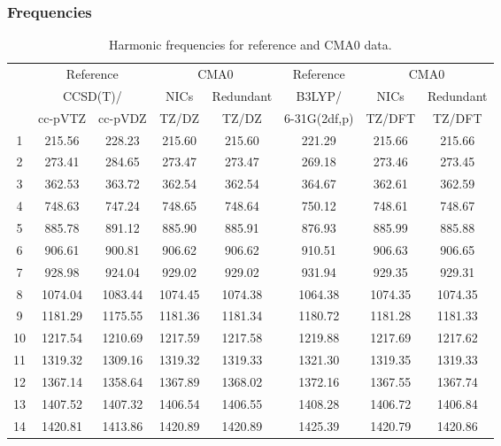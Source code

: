 \documentclass[10pt,oneside]{article}
\begin{document}
\begin{table}[h!]
\subsubsection*{Frequencies}
\centering
\caption{Harmonic frequencies for reference and CMA0 data.}
\begin{tabular}{cccccccc}
\toprule
{} & \multicolumn{2}{c}{Reference} & \multicolumn{2}{c}{CMA0} &    Reference & \multicolumn{2}{c}{CMA0} \\
{} & \multicolumn{2}{c}{CCSD(T)/} &    NICs &  Redundant &       B3LYP/ &    NICs & Redundant \\
{} &   cc-pVTZ & cc-pVDZ &   TZ/DZ &      TZ/DZ & 6-31G(2df,p) &  TZ/DFT &    TZ/DFT \\
\midrule
1  &    215.56 &  228.23 &  215.60 &     215.60 &       221.29 &  215.66 &    215.66 \\
2  &    273.41 &  284.65 &  273.47 &     273.47 &       269.18 &  273.46 &    273.45 \\
3  &    362.53 &  363.72 &  362.54 &     362.54 &       364.67 &  362.61 &    362.59 \\
4  &    748.63 &  747.24 &  748.65 &     748.64 &       750.12 &  748.61 &    748.67 \\
5  &    885.78 &  891.12 &  885.90 &     885.91 &       876.93 &  885.99 &    885.88 \\
6  &    906.61 &  900.81 &  906.62 &     906.62 &       910.51 &  906.63 &    906.65 \\
7  &    928.98 &  924.04 &  929.02 &     929.02 &       931.94 &  929.35 &    929.31 \\
8  &   1074.04 & 1083.44 & 1074.45 &    1074.38 &      1064.38 & 1074.35 &   1074.35 \\
9  &   1181.29 & 1175.55 & 1181.36 &    1181.34 &      1180.72 & 1181.28 &   1181.33 \\
10 &   1217.54 & 1210.69 & 1217.59 &    1217.58 &      1219.88 & 1217.69 &   1217.62 \\
11 &   1319.32 & 1309.16 & 1319.32 &    1319.33 &      1321.30 & 1319.35 &   1319.33 \\
12 &   1367.14 & 1358.64 & 1367.89 &    1368.02 &      1372.16 & 1367.55 &   1367.74 \\
13 &   1407.52 & 1407.32 & 1406.54 &    1406.55 &      1408.28 & 1406.72 &   1406.84 \\
14 &   1420.81 & 1413.86 & 1420.89 &    1420.89 &      1425.39 & 1420.79 &   1420.86 \\

\end{tabular}
\end{table}
\end{document}
